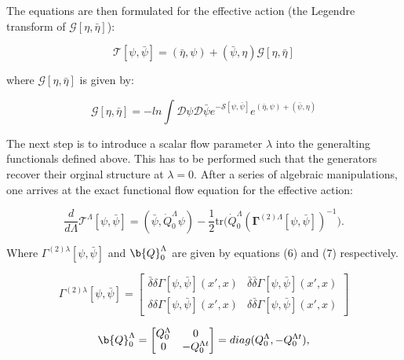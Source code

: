\documentclass[12pt]{article}
\begin{document}
The equations are then formulated for the effective action (the Legendre transform of $\mathcal{G}[\eta, \bar{\eta}]$):

\begin{equation} \label{Effective action}
    \mathcal{T}[\psi, \bar{\psi}] = (\bar{\eta},\psi) + (\bar{\psi},\eta) \mathcal{G}[\eta, \bar{\eta}]
\end{equation}

where $\mathcal{G}[\eta, \bar{\eta}]$ is given by:


\begin{equation}\label{G term in effective action}
\mathcal{G}[\eta, \bar{\eta}] = 
-ln \int{\mathcal{D}\psi \mathcal{D} \bar{\psi}e^{-\mathcal{S}[\psi, \bar{\psi}]}e^{(\bar{\eta}, \psi) +(\bar{\psi}, \eta)}}
\end{equation}

The next step is to introduce a scalar flow parameter $\lambda$ into the generalting functionals defined above. This has to be performed such that the generators recover their orginal structure at $\lambda = 0 $. After a series of algebraic manipulations, one arrives at the exact functional flow equation for the effective action:


\begin{equation} \label{eq:ExactFunctionalFlowEquation}
    \frac{d}{d\Lambda} \mathcal{T}^{\Lambda}[\psi, \bar{\psi}] = (\bar{\psi}, \dot{Q}_0^{\Lambda} \psi) - \frac{1}{2} \text{tr} \big( \dot{Q}_0^{\Lambda} (\boldsymbol{\Gamma}^{(2)\Lambda}[\psi, \bar{\psi}])^{-1} \big).
\end{equation}

Where $\Gamma^{(2)\lambda}[\psi, \bar{\psi}]$ and  $\b{Q}_0^{\Lambda}$ are given by equations (6) and (7) respectively.



\begin{equation}\label{Gamma term}
\Gamma^{(2)\lambda}[\psi, \bar{\psi}] = 
\begin{bmatrix}
\bar{\delta} \delta \Gamma[\psi, \bar{\psi}](x',x) & \bar{\delta} \bar{\delta} \Gamma[\psi, \bar{\psi}](x',x) \\
\delta \delta \Gamma[\psi, \bar{\psi}](x',x)  & \delta \bar{\delta} \Gamma[\psi, \bar{\psi}](x',x)
\end{bmatrix}
\end{equation}



\begin{equation}\label{Q0 term }
\b{Q}_0^{\Lambda} =
\begin{bmatrix}
Q_0^{\Lambda} & 0 \\
0 & -Q_0^{\Lambda t}
\end{bmatrix}
= diag(Q_0^{\Lambda}, - Q_0^{\Lambda t}),
\end{equation}
\end{document}

